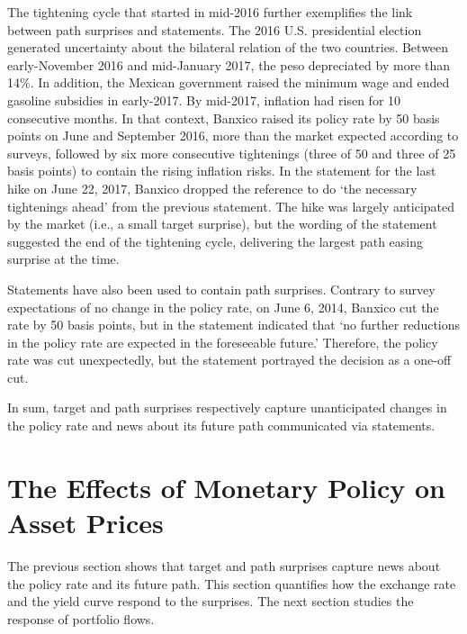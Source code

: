 \documentclass[a4paper, 12pt]{article}
\begin{document}
The tightening cycle that started in mid-2016 further exemplifies the link between path surprises and statements. 
The 2016 U.S. presidential election generated uncertainty about the bilateral relation of the two countries. Between early-November 2016 and mid-January 2017, the peso depreciated by more than 14\%. 
In addition, the Mexican government raised the minimum wage and ended gasoline subsidies in early-2017. By mid-2017, inflation had risen for 10 consecutive months. 
In that context, Banxico raised its policy rate by 50 basis points on June and September 2016, more than the market expected according to surveys, followed by six more consecutive tightenings (three of 50 and three of 25 basis points) to contain the rising inflation risks. 
In the statement for the last hike on June 22, 2017, Banxico dropped the reference to do `the necessary tightenings ahead' from the previous statement. 
The hike was largely anticipated by the market (i.e., a small target surprise), but the wording of the statement suggested the end of the tightening cycle, delivering the largest path easing surprise at the time. 

Statements have also been used to contain path surprises. 
Contrary to survey expectations of no change in the policy rate, on June 6, 2014, Banxico cut the rate by 50 basis points, but in the statement indicated that `no further reductions in the policy rate are expected in the foreseeable future.' Therefore, the policy rate was cut unexpectedly, but the statement portrayed the decision as a one-off cut. 

In sum, target and path surprises respectively capture unanticipated changes in the policy rate and news about its future path communicated via statements. 


\section{The Effects of Monetary Policy on Asset Prices} \label{sec:assets}
The previous section shows that target and path surprises capture news about the policy rate and its future path. 
This section quantifies how the exchange rate and the yield curve respond to the surprises. 
The next section studies the response of portfolio flows.
\end{document}
